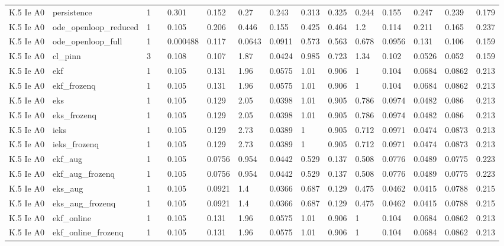 \begin{table}[t]
\begin{tabular}{lllllllllllllll}
K.5 Ie A0 & persistence & 1 &  & 0.301 & 0.152 & 0.27 & 0.243 & 0.313 & 0.325 & 0.244 & 0.155 & 0.247 & 0.239 & 0.179 \\
K.5 Ie A0 & ode\_openloop\_reduced & 1 &  & 0.105 & 0.206 & 0.446 & 0.155 & 0.425 & 0.464 & 1.2 & 0.114 & 0.211 & 0.165 & 0.237 \\
K.5 Ie A0 & ode\_openloop\_full & 1 &  & 0.000488 & 0.117 & 0.0643 & 0.0911 & 0.573 & 0.563 & 0.678 & 0.0956 & 0.131 & 0.106 & 0.159 \\
K.5 Ie A0 & cl\_pinn & 3 &  & 0.108 & 0.107 & 1.87 & 0.0424 & 0.985 & 0.723 & 1.34 & 0.102 & 0.0526 & 0.052 & 0.159 \\
K.5 Ie A0 & ekf & 1 &  & 0.105 & 0.131 & 1.96 & 0.0575 & 1.01 & 0.906 & 1 & 0.104 & 0.0684 & 0.0862 & 0.213 \\
K.5 Ie A0 & ekf\_frozenq & 1 &  & 0.105 & 0.131 & 1.96 & 0.0575 & 1.01 & 0.906 & 1 & 0.104 & 0.0684 & 0.0862 & 0.213 \\
K.5 Ie A0 & eks & 1 &  & 0.105 & 0.129 & 2.05 & 0.0398 & 1.01 & 0.905 & 0.786 & 0.0974 & 0.0482 & 0.086 & 0.213 \\
K.5 Ie A0 & eks\_frozenq & 1 &  & 0.105 & 0.129 & 2.05 & 0.0398 & 1.01 & 0.905 & 0.786 & 0.0974 & 0.0482 & 0.086 & 0.213 \\
K.5 Ie A0 & ieks & 1 &  & 0.105 & 0.129 & 2.73 & 0.0389 & 1 & 0.905 & 0.712 & 0.0971 & 0.0474 & 0.0873 & 0.213 \\
K.5 Ie A0 & ieks\_frozenq & 1 &  & 0.105 & 0.129 & 2.73 & 0.0389 & 1 & 0.905 & 0.712 & 0.0971 & 0.0474 & 0.0873 & 0.213 \\
K.5 Ie A0 & ekf\_aug & 1 &  & 0.105 & 0.0756 & 0.954 & 0.0442 & 0.529 & 0.137 & 0.508 & 0.0776 & 0.0489 & 0.0775 & 0.223 \\
K.5 Ie A0 & ekf\_aug\_frozenq & 1 &  & 0.105 & 0.0756 & 0.954 & 0.0442 & 0.529 & 0.137 & 0.508 & 0.0776 & 0.0489 & 0.0775 & 0.223 \\
K.5 Ie A0 & eks\_aug & 1 &  & 0.105 & 0.0921 & 1.4 & 0.0366 & 0.687 & 0.129 & 0.475 & 0.0462 & 0.0415 & 0.0788 & 0.215 \\
K.5 Ie A0 & eks\_aug\_frozenq & 1 &  & 0.105 & 0.0921 & 1.4 & 0.0366 & 0.687 & 0.129 & 0.475 & 0.0462 & 0.0415 & 0.0788 & 0.215 \\
K.5 Ie A0 & ekf\_online & 1 &  & 0.105 & 0.131 & 1.96 & 0.0575 & 1.01 & 0.906 & 1 & 0.104 & 0.0684 & 0.0862 & 0.213 \\
K.5 Ie A0 & ekf\_online\_frozenq & 1 &  & 0.105 & 0.131 & 1.96 & 0.0575 & 1.01 & 0.906 & 1 & 0.104 & 0.0684 & 0.0862 & 0.213 \\

\end{tabular}
\end{table}
